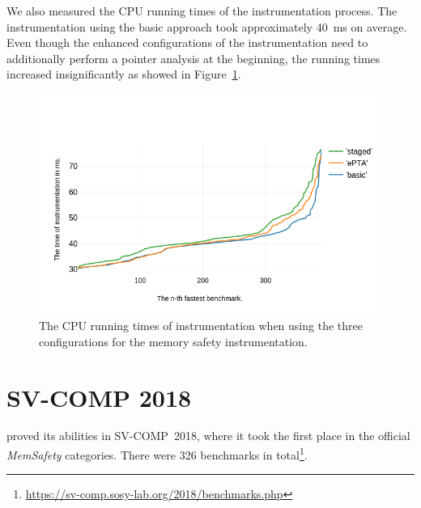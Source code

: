 We also measured the CPU running times of the instrumentation process. The
instrumentation using the basic approach took approximately 40~ms on average.
Even though the enhanced configurations of the instrumentation need to
additionally perform a pointer analysis at the beginning, the running times increased
insignificantly as showed in Figure~\ref{fig:times_chart}.

\begin{figure}[h]
  \includegraphics[width=\textwidth]{charts/instr_times_chart.png}
  \caption{The CPU running times of instrumentation when using
  the three configurations for the memory safety instrumentation.}
  \label{fig:times_chart}
\end{figure}

\section{SV-COMP 2018}

\symbiotic proved its abilities in SV-COMP~2018, where it took the first place
in the official \emph{MemSafety} categories. There were 326 benchmarks in
total\footnote{\url{https://sv-comp.sosy-lab.org/2018/benchmarks.php}}.

